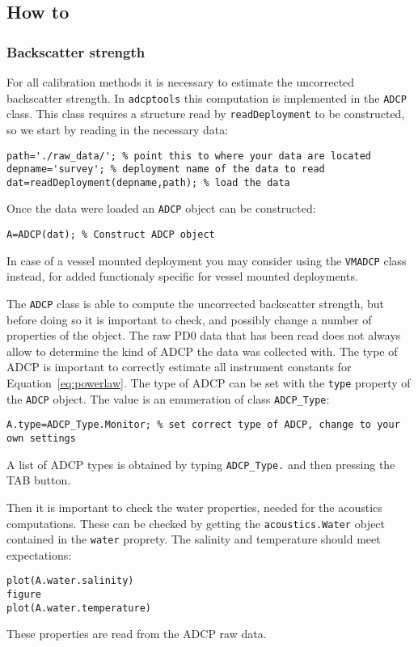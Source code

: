 \documentclass[]{article}
\begin{document}
\subsection{How to}
\label{sec:general_howto}
\subsubsection{Backscatter strength}
For all calibration methods it is necessary to estimate the uncorrected backscatter strength. In \lstinline!adcptools! this computation is implemented in the \lstinline!ADCP! class. This class requires a structure read by \lstinline!readDeployment! to be constructed, so we start by reading in the necessary data:
\begin{lstlisting}
path='./raw_data/'; % point this to where your data are located
depname='survey'; % deployment name of the data to read
dat=readDeployment(depname,path); % load the data
\end{lstlisting}

Once the data were loaded an \lstinline!ADCP! object can be constructed:
\begin{lstlisting}
A=ADCP(dat); % Construct ADCP object
\end{lstlisting}
In case of a vessel mounted deployment you may consider using the \lstinline!VMADCP! class instead, for added functionaly specific for vessel mounted deployments.

The \lstinline!ADCP! class is able to compute the uncorrected backscatter strength, but before doing so it is important to check, and possibly change a number of properties of the object.
The raw PD0 data that has been read does not always allow to determine the kind of ADCP the data was collected with. The type of ADCP is important to correctly estimate all instrument constants for Equation~\ref{eq:powerlaw}. The type of ADCP can be set with the \lstinline!type! property of the \lstinline!ADCP! object. The value is an enumeration of class \lstinline!ADCP_Type!: 
\begin{lstlisting}
A.type=ADCP_Type.Monitor; % set correct type of ADCP, change to your own settings
\end{lstlisting}
A list of ADCP types is obtained by typing \lstinline!ADCP_Type.! and then pressing the TAB button.

Then it is important to check the water properties, needed for the acoustics computations. These can be checked by getting the \lstinline!acoustics.Water! object contained in the \lstinline!water! proprety. The salinity and temperature should meet expectations:
\begin{lstlisting}
plot(A.water.salinity)
figure
plot(A.water.temperature)
\end{lstlisting}
These properties are read from the ADCP raw data.
\end{document}
